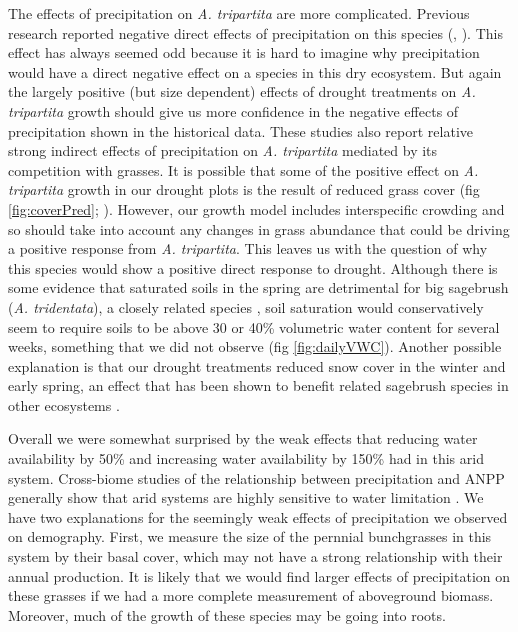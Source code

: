 \documentclass[11pt]{article}
\begin{document}
\begin{doublespacing}
The effects of precipitation on \textit{A. tripartita} are more complicated. Previous research reported negative direct effects of precipitation on this species (\citep{adler_forecasting_2012}, \citep{chu_direct_2016}). This effect has always seemed odd because it is hard to imagine why precipitation would have a direct negative effect on a species in this dry ecosystem. But again the largely positive (but size dependent) effects of drought treatments on \textit{A. tripartita} growth should give us more confidence in the negative effects of precipitation shown in the historical data. These studies also report relative strong indirect effects of precipitation on \textit{A. tripartita} mediated by its competition with grasses. It is possible that some of the positive effect on \textit{A. tripartita} growth in our drought plots is the result of reduced grass cover (fig \ref{fig:coverPred}; \citep{chu_direct_2016}). However, our growth model includes interspecific crowding and so should take into account any changes in grass abundance that could be driving a positive response from \textit{A. tripartita}. This leaves us with the question of why this species would show a positive direct response to drought. Although there is some evidence that saturated soils in the spring are detrimental for big sagebrush (\textit{A. tridentata}), a closely related species \citep{sturges_response_1989,germino_desert_2014}, soil saturation would conservatively seem to require soils to be above 30 or 40\% volumetric water content for several weeks, something that we did not observe (fig \ref{fig:dailyVWC}). Another possible explanation is that our drought treatments reduced snow cover in the winter and early spring, an effect that has been shown to benefit related sagebrush species in other ecosystems \citep{perfors_enhanced_2003}. 

Overall we were somewhat surprised by the weak effects that reducing water availability by 50\% and increasing water availability by 150\% had in this arid system. Cross-biome studies of the relationship between precipitation and ANPP generally show that arid systems are highly sensitive to water limitation \citep{huxman_convergence_2004}. We have two explanations for the seemingly weak effects of precipitation we observed on demography. First, we measure the size of the pernnial bunchgrasses in this system by their basal cover, which may not have a strong relationship with their annual production. It is likely that we would find larger effects of precipitation on these grasses if we had a more complete measurement of aboveground biomass. Moreover, much of the growth of these species may be going into roots. 


\end{doublespacing}
\end{document}
